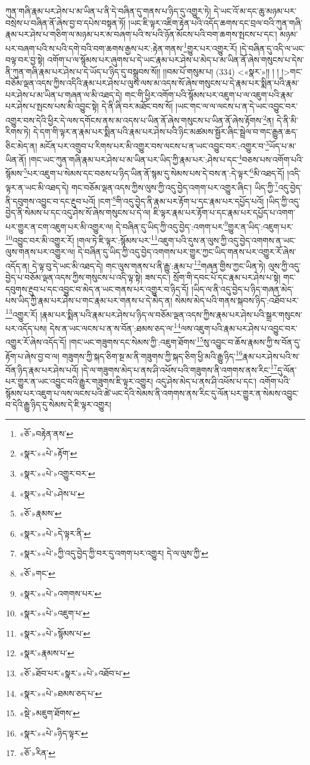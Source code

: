 ཀུན་གཞི་རྣམ་པར་ཤེས་པ་མ་ཡིན་པ་ནི་དེ་བཞིན་དུ་གནས་པ་ཉིད་དུ་འགྱུར་ཏེ། དེ་ཡང་འོ་མ་དང་ཆུ་མཉམ་པར་བསྲེས་པ་བཞིན་ནོ་ཞེས་བྱ་བ་དཔེས་བསྟན་ཏོ། །ཡང་ཇི་ལྟར་འཇིག་རྟེན་པའི་འདོད་ཆགས་དང་བྲལ་བའི་ཀུན་གཞི་རྣམ་པར་ཤེས་པ་གཅིག་ལ་མཉམ་པར་མ་བཞག་པའི་ས་པའི་ཉོན་མོངས་པའི་བག་ཆགས་སྤངས་པ་དང་། མཉམ་པར་བཞག་པའི་ས་པའི་དགེ་བའི་བག་ཆགས་རྒྱས་པར་:རྟེན་གནས་\footnote{«ཅོ་»བརྟེན་ནས་}གྱུར་པར་འགྱུར་རོ། །དེ་བཞིན་དུ་འདི་ལ་ཡང་བལྟ་བར་བྱ་སྟེ། འགོག་པ་ལ་སྙོམས་པར་ཞུགས་པ་དེ་ཡང་རྣམ་པར་ཤེས་པ་མེད་པ་མ་ཡིན་ནོ་ཞེས་གསུངས་པ་དེས་ནི་ཀུན་གཞི་རྣམ་པར་ཤེས་པ་དེ་ཡོད་པ་ཉིད་དུ་བསྒྲུབས་སོ།། །།བམ་པོ་གསུམ་པ། (334) <«སྣར་»།། །
། །>གང་བཅོམ་ལྡན་འདས་ཀྱིས་འདིའི་རྣམ་པར་ཤེས་པ་ལུས་ལས་མ་འདས་སོ་ཞེས་གསུངས་པ་དེ་རྣམ་པར་སྨིན་པའི་རྣམ་པར་ཤེས་པ་མ་ཡིན་པ་གཞན་ལ་མི་འཐད་དེ། གང་གི་ཕྱིར་འགོག་པའི་སྙོམས་པར་འཇུག་པ་ལ་འཇུག་པའི་རྣམ་པར་ཤེས་པ་སྤངས་པས་མི་འབྱུང་སྟེ། དེ་ནི་ཞི་བར་མཐོང་བས་སོ། །ཡང་གང་ལ་ལ་ལངས་པ་ན་དེ་ཡང་འབྱུང་བར་འགྱུར་བས་དེའི་ཕྱིར་དེ་ལས་དགོངས་ནས་མ་འདས་པ་ཡིན་ནོ་ཞེས་གསུངས་པ་ཡིན་ནོ་ཞེས་རྟོགས་\footnote{«སྣར་»«པེ་»རྟོག་}ན། དེ་ནི་མི་རིགས་ཏེ། དེ་དག་གི་ལྟར་ན་རྣམ་པར་སྨིན་པའི་རྣམ་པར་ཤེས་པའི་ཉིང་མཚམས་སྦྱོར་ཞིང་སྦྲེལ་བ་གང་རྒྱུན་ཆད་ཅིང་མེད་ན། མངོན་པར་འགྲུབ་པ་རིགས་པར་མི་འགྱུར་བས་ལངས་པ་ན་ཡང་འབྱུང་བར་:འགྱུར་བ་\footnote{«སྣར་»«པེ་»འགྱུར་བར་}ཡོད་པ་མ་ཡིན་ནོ། །གང་ཡང་ཀུན་གཞི་རྣམ་པར་ཤེས་པ་མ་ཡིན་པར་ཡིད་ཀྱི་རྣམ་པར་:ཤེས་པ་དང་\footnote{«སྣར་»«པེ་»ཤེས་པ་}བཅས་པས་འགོག་པའི་སྙོམས་\footnote{«ཅོ་»རྣམས་}པར་འཇུག་པ་སེམས་དང་བཅས་པ་ཉིད་ཡིན་ནོ་སྙམ་དུ་སེམས་པས་དེ་བས་ན་:དེ་ལྟར་\footnote{«སྣར་»«པེ་»དེ་ལྟར་ནི་}མི་འཐད་དོ། །འདི་ལྟར་ན་ཡང་མི་འཐད་དེ། གང་བཅོམ་ལྡན་འདས་ཀྱིས་ལུས་ཀྱི་འདུ་བྱེད་འགག་པར་འགྱུར་ཞིང་། ཡིད་ཀྱི་\footnote{«སྣར་»«པེ་»ཀྱི་འདུ་བྱེད་ཀྱི་བར་དུ་འགག་པར་འགྱུར། དེ་ལ་ལུས་ཀྱི་}འདུ་བྱེད་ནི་དབུགས་འབྱུང་བ་དང་རྔུབ་པའོ། །ངག་\footnote{«ཅོ་»གང་}གི་འདུ་བྱེད་ནི་རྣམ་པར་རྟོག་པ་དང་རྣམ་པར་དཔྱོད་པའོ། །ཡིད་ཀྱི་འདུ་བྱེད་ནི་སེམས་པ་དང་འདུ་ཤེས་སོ་ཞེས་གསུངས་པ་དེ་ལ། ཇི་ལྟར་རྣམ་པར་རྟོག་པ་དང་རྣམ་པར་དཔྱོད་པ་འགག་པར་གྱུར་ན་ངག་འཇུག་པར་མི་འགྱུར་ལ། དེ་བཞིན་དུ་ཡིད་ཀྱི་འདུ་བྱེད་:འགག་པར་\footnote{«སྣར་»«པེ་»འགགས་པར་}གྱུར་ན་ཡིད་:འཇུག་པར་\footnote{«སྣར་»«པེ་»འཇུག་པ་}འབྱུང་བར་མི་འགྱུར་རོ། །གལ་ཏེ་ཇི་ལྟར་:སྙོམས་པར་\footnote{«སྣར་»«པེ་»སྙོམས་པ་}འཇུག་པའི་དུས་ན་ལུས་ཀྱི་འདུ་བྱེད་འགགས་ན་ཡང་ལུས་གནས་པར་འགྱུར་ལ། དེ་བཞིན་དུ་ཡིད་ཀྱི་འདུ་བྱེད་འགགས་པར་གྱུར་ཀྱང་ཡིད་གནས་པར་འགྱུར་རོ་ཞེས་འདོད་ན། དེ་ལྟ་བུ་དེ་ཡང་མི་འཐད་དེ། གང་ལུས་གནས་པ་ནི་རྒྱུ་:རྣམ་པ་\footnote{«སྣར་»རྣམས་པ་}གཞན་གྱིས་ཀྱང་ཡིན་ཏེ། ལུས་ཀྱི་འདུ་བྱེད་པ་བཅོམ་ལྡན་འདས་ཀྱིས་གསུངས་པ་འདི་ལྟ་སྟེ། ཟས་དང་། སྲོག་གི་དབང་པོ་དང་རྣམ་པར་ཤེས་པ་སྟེ། གང་དབུགས་རྔུབ་པ་དང་འབྱུང་བ་མེད་ན་ཡང་གནས་པར་འགྱུར་བ་ཉིད་དོ། །ཡིད་ལ་ནི་འདུ་བྱེད་པ་ཉིད་གཞན་མེད་པས་ཡིད་ཀྱི་རྣམ་པར་ཤེས་པ་གང་རྣམ་པར་གནས་པ་དེ་མེད་ན། སེམས་མེད་པའི་གནས་སྐབས་ཉིད་:འཐོབ་པར་\footnote{«ཅོ་»ཐོབ་པར་«སྣར་»«པེ་»འཐོབ་པ་}འགྱུར་རོ། །རྣམ་པར་སྨིན་པའི་རྣམ་པར་ཤེས་པ་ཉིད་ལ་བཅོམ་ལྡན་འདས་ཀྱིས་རྣམ་པར་ཤེས་པའི་སྒྲར་གསུངས་པར་འདོད་པས། དེས་ན་ཡང་ལངས་པ་ན་ས་བོན་:ཐམས་ཅད་ལ་\footnote{«སྣར་»«པེ་»ཐམས་ཅད་པ་}ལས་འཇུག་པའི་རྣམ་པར་ཤེས་པ་འབྱུང་བར་འགྱུར་རོ་ཞེས་འདོད་དོ། །གང་ཡང་གཟུགས་དང་སེམས་ཀྱི་:འཇུག་ཐོགས་\footnote{«སྡེ་»མཇུག་ཐོགས་}སུ་འབྱུང་བ་ཆོས་རྣམས་ཀྱི་ས་བོན་དུ་རྟོག་པ་ཞེས་བྱ་བ་ལ། གཟུགས་ཀྱི་སྐད་ཅིག་སྔ་མ་ནི་གཟུགས་ཀྱི་སྐད་ཅིག་ཕྱི་མའི་རྒྱུ་ཉིད་\footnote{«སྣར་»«པེ་»ཉིད་ལྟར་}རྣམ་པར་ཤེས་པའི་ས་བོན་ཉིད་རྣམ་པར་ཤེས་པའོ། །དེ་ལ་གཟུགས་མེད་པ་ནས་ཤི་འཕོས་པའི་གཟུགས་ནི་འགགས་ནས་རིང་\footnote{«ཅོ་»རིན་}དུ་ལོན་པར་གྱུར་ན་ཡང་འབྱུང་བའི་རྒྱུར་གཟུགས་ཇི་ལྟར་འགྱུར། འདུ་ཤེས་མེད་པ་ནས་ཤི་འཕོས་པ་དང་། འགོག་པའི་སྙོམས་པར་འཇུག་པ་ལས་ལངས་པའི་ཚེ་ཡང་དེའི་སེམས་ནི་འགགས་ནས་རིང་དུ་ལོན་པར་གྱུར་ན་སེམས་འབྱུང་བ་དེའི་རྒྱུ་ཉིད་དུ་སེམས་དེ་ཇི་ལྟར་འགྱུར། 
